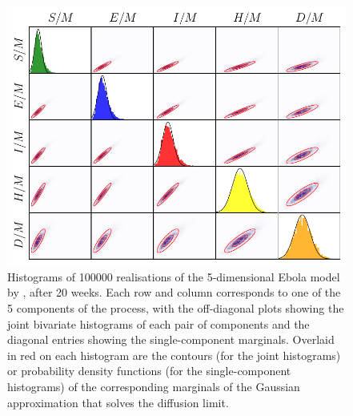 \begin{landscape}
	\begin{figure}
		\centering
		\includegraphics[width=\textheight]{chp06_applications/figures/seihfr/seihfr_marginals_gaussian}
		\caption{Histograms of 100000 realisations of the 5-dimensional Ebola model by \citet{LegrandEtAl_2007_UnderstandingDynamicsEbola}, after 20 weeks.
			Each row and column corresponds to one of the 5 components of the process, with the off-diagonal plots showing the joint bivariate histograms of each pair of components and the diagonal entries showing the single-component marginals.
			Overlaid in red on each histogram are the contours (for the joint histograms) or probability density functions (for the single-component histograms) of the corresponding marginals of the Gaussian approximation that solves the diffusion limit.}
		\label{fig:ebola_marginals}
	\end{figure}
\end{landscape}



